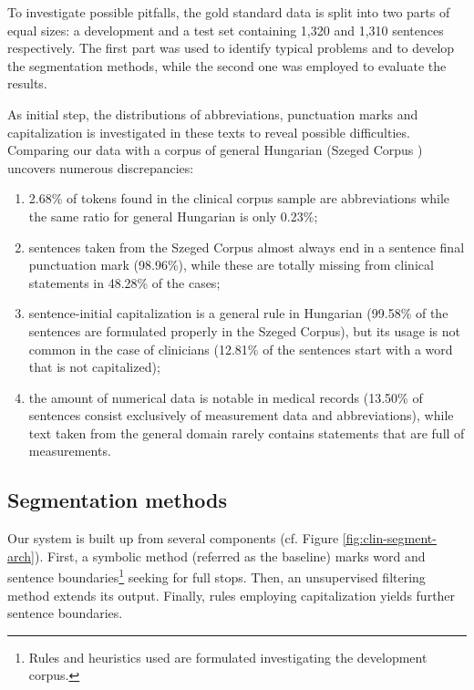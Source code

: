 To investigate possible pitfalls, the gold standard data is split into two parts of equal sizes: a development and a test set containing 1,320 and 1,310 sentences respectively. 
The first part was used to identify typical problems and to develop the segmentation methods, while the second one was employed to evaluate the results. 

As initial step, the distributions of abbreviations, punctuation marks and capitalization is investigated in these texts to reveal possible difficulties. 
Comparing our data with a corpus of general Hungarian (Szeged Corpus \cite{Csendes2004}) uncovers numerous discrepancies: 
\begin{enumerate}
 \item 2.68\% of tokens found in the clinical corpus sample are abbreviations while the same ratio for general Hungarian is only 0.23\%; 
 \item sentences taken from the Szeged Corpus almost always end in a sentence final punctuation mark (98.96\%), while these are totally missing from clinical statements in 48.28\% of the cases; 
 \item sentence-initial capitalization is a general rule in Hungarian (99.58\% of the sentences are formulated properly in the Szeged Corpus), but its usage is not common in the case of clinicians (12.81\% of the sentences start with a word that is not capitalized); 
 \item the amount of numerical data is notable in medical records (13.50\% of sentences consist exclusively of measurement data and abbreviations), while text taken from the general domain rarely contains statements that are full of measurements. 
\end{enumerate}




\subsection{Segmentation methods}
\label{sec:clinical_segmentation}

Our system is built up from several components (cf. Figure \ref{fig:clin-segment-arch}). 
First, a symbolic method (referred as the baseline) marks word and sentence boundaries\footnote{Rules and heuristics used are formulated investigating the development corpus.} seeking for full stops. 
Then, an unsupervised filtering method extends its output.
Finally, rules employing capitalization yields further sentence boundaries.

